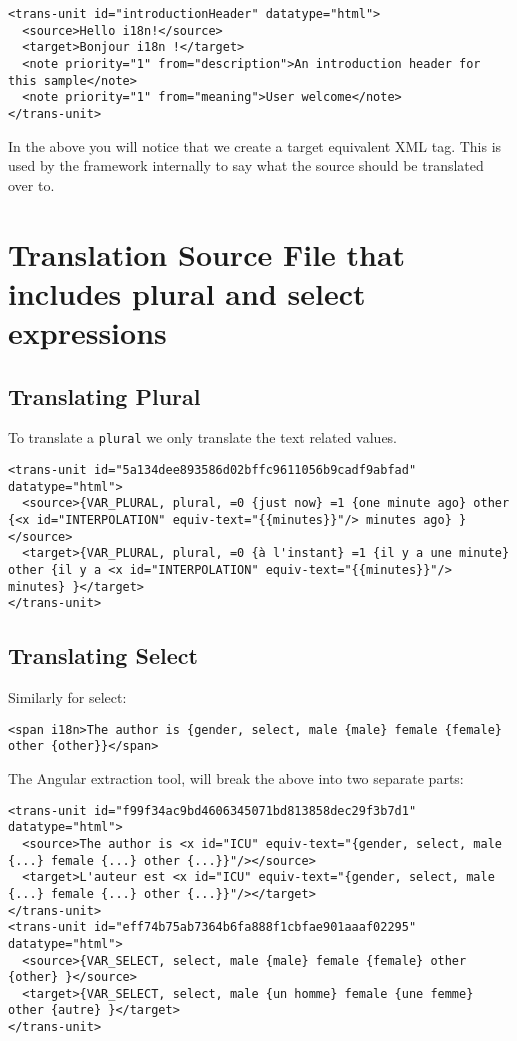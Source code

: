 \begin{lstlisting}[caption=src/locale/messages.fr.xlf(after translation)]
<trans-unit id="introductionHeader" datatype="html">
  <source>Hello i18n!</source>
  <target>Bonjour i18n !</target>
  <note priority="1" from="description">An introduction header for this sample</note>
  <note priority="1" from="meaning">User welcome</note>
</trans-unit>
\end{lstlisting}

In the above you will notice that we create a target equivalent XML tag. This
is used by the framework internally to say what the source should be translated 
over to. 

\section{Translation Source File that includes plural and select expressions}

\subsection{Translating Plural}
To translate a \lstinline{plural} we only translate the text related values. 

\begin{lstlisting}[caption=src/locale/messages.fr.xlf]
<trans-unit id="5a134dee893586d02bffc9611056b9cadf9abfad" datatype="html">
  <source>{VAR_PLURAL, plural, =0 {just now} =1 {one minute ago} other {<x id="INTERPOLATION" equiv-text="{{minutes}}"/> minutes ago} }</source>
  <target>{VAR_PLURAL, plural, =0 {à l'instant} =1 {il y a une minute} other {il y a <x id="INTERPOLATION" equiv-text="{{minutes}}"/> minutes} }</target>
</trans-unit>  
\end{lstlisting}

\subsection{Translating Select}
Similarly for select: 
\begin{lstlisting}
<span i18n>The author is {gender, select, male {male} female {female} other {other}}</span>  
\end{lstlisting}

The Angular extraction tool, will break the above into two separate parts: 
\begin{lstlisting}[caption=src/locale/messages.fr.xlf]
<trans-unit id="f99f34ac9bd4606345071bd813858dec29f3b7d1" datatype="html">
  <source>The author is <x id="ICU" equiv-text="{gender, select, male {...} female {...} other {...}}"/></source>
  <target>L'auteur est <x id="ICU" equiv-text="{gender, select, male {...} female {...} other {...}}"/></target>
</trans-unit>  
<trans-unit id="eff74b75ab7364b6fa888f1cbfae901aaaf02295" datatype="html">
  <source>{VAR_SELECT, select, male {male} female {female} other {other} }</source>
  <target>{VAR_SELECT, select, male {un homme} female {une femme} other {autre} }</target>
</trans-unit>
\end{lstlisting}

